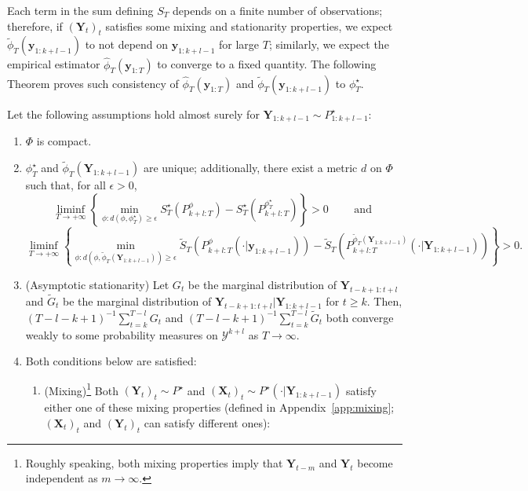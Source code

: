 \documentclass[twoside,11pt]{article}
\newcommand{\ddobs}{\mathbf{y}}
\newcommand{\Ddsim}{\mathbf{X}}
\newcommand{\Ddobs}{\mathbf{Y}}
\newcommand{\Ddobsupkplusl}{\mathbf{Y}_{1:k+l-1}}
\newcommand{\ddobsupT}{\mathbf{y}_{1:T}}
\begin{document}
	Each term in the sum defining $ S_T $ depends on a finite number of observations; therefore, if $ (\Ddobs_t)_t $ satisfies some mixing and stationarity properties, we expect $  \tilde \phi_T(\ddobs_{1:k+l-1}) $ to not depend on $ \ddobs_{1:k+l-1} $ for large $ T $; similarly, we expect the empirical estimator $ \hat \phi_T(\ddobsupT) $ to converge to a fixed quantity. The following Theorem proves such consistency of $ \hat \phi_T(\ddobsupT) $ and $ \tilde \phi_T(\ddobs_{1:k+l-1}) $ to $ \phi^\star_T $.
	
	
	
	\begin{theorem}\label{Th:main_consistency}
		Let the following assumptions hold almost surely for $ \Ddobsupkplusl \sim P^\star_{1:k+l-1}$:
		\begin{enumerate}
			\item \label{ass:1} $ \Phi $ is compact.
			\item \label{ass:2} $ \phi^\star_T $ and $ 	\tilde\phi_T(\Ddobsupkplusl) $ are unique; additionally, there exist a metric $ d $ on $ \Phi $ such that, for all $ \epsilon>0 $,
			\begin{equation}\label{}
			\liminf_{T\to+\infty} \left\{ \min_{\phi: d(\phi, {\phi^\star_T})\ge\epsilon} S_T^\star(P_{k+l:T}^\phi) - S_T^\star(P_{k+l:T}^{\phi^\star_T})    \right\} >0 \qquad \text{ and }
			\end{equation}
			\begin{equation}\label{}
			\liminf_{T\to+\infty} \left\{ \min_{\phi: d(\phi, {	\tilde\phi_T(\Ddobsupkplusl)})\ge\epsilon} \tilde S_T(P^\phi_{k+l:T}(\cdot|\ddobs_{1:k+l-1})) - \tilde S_T(P^{\tilde\phi_T(\Ddobsupkplusl)}_{k+l:T}(\cdot|\Ddobs_{1:k+l-1}))    \right\} >0.
			\end{equation}
			\item \label{ass:3} (Asymptotic stationarity) Let $ G_t $ be the marginal distribution of $ \Ddobs_{t-k+1:t+l} $ and $\tilde G_t $ be the marginal distribution of $ \Ddobs_{t-k+1:t+l}|\Ddobsupkplusl $ for $ t\ge k $. Then, $ (T-l-k+1)^{-1} \sum_{t=k}^{T-l} G_t $ and $ (T-l-k+1)^{-1} \sum_{t=k}^{T-l} \tilde G_t $ both converge weakly to some probability measures on $ \mathcal{Y}^{k+l} $ as $ T \to\infty$.
			\item \label{ass:4} Both conditions below are satisfied:
			\begin{enumerate}
				\item (Mixing)\footnote{Roughly speaking, both mixing properties imply that $ \Ddobs_{t-m}$  and  $\Ddobs_{t} $ become independent as $ m\to\infty $.} Both $ (\Ddobs_t)_t \sim P^\star $ and $ (\Ddsim_t)_t \sim P^\star(\cdot|\Ddobsupkplusl)$ satisfy either one of these mixing properties (defined in Appendix~\ref{app:mixing}; $ (\Ddsim_t)_t $ and $ (\Ddobs_t)_t$ can satisfy different ones): 

\end{enumerate}
\end{enumerate}
\end{theorem}
\end{document}
